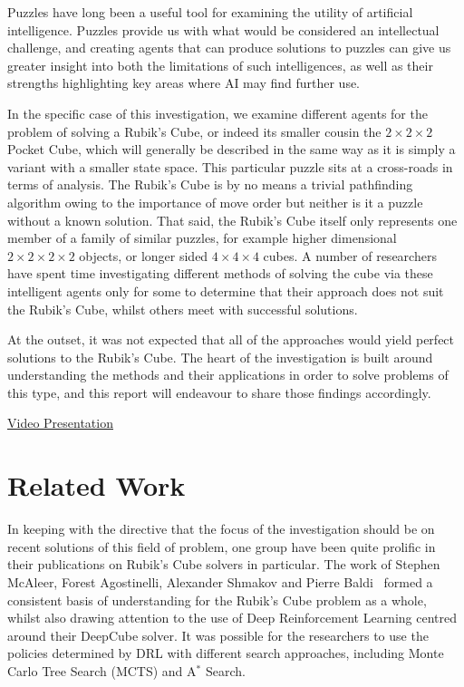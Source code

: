 \documentclass[UKenglish]{svproc}
\begin{document}
Puzzles have long been a useful tool for examining the utility of artificial intelligence. Puzzles provide us with what would be considered an intellectual challenge, and creating agents that can produce solutions to puzzles can give us greater insight into both the limitations of such intelligences, as well as their strengths highlighting key areas where AI may find further use.

In the specific case of this investigation, we examine different agents for the problem of solving a Rubik's Cube, or indeed its smaller cousin the $2\times 2\times 2$ Pocket Cube, which will generally be described in the same way as it is simply a variant with a smaller state space. This particular puzzle sits at a cross-roads in terms of analysis. The Rubik's Cube is by no means a trivial pathfinding algorithm owing to the importance of move order but neither is it a puzzle without a known solution. That said, the Rubik's Cube itself only represents one member of a family of similar puzzles, for example higher dimensional $2\times 2\times 2\times 2$ objects, or longer sided $4\times 4\times 4$ cubes. A number of researchers have spent time investigating different methods of solving the cube via these intelligent agents only for some to determine that their approach does not suit the Rubik's Cube, whilst others meet with successful solutions.

At the outset, it was not expected that all of the approaches would yield perfect solutions to the Rubik's Cube. The heart of the investigation is built around understanding the methods and their applications in order to solve problems of this type, and this report will endeavour to share those findings accordingly.

\par

\centerline{
\href{https://tcdud-my.sharepoint.com/:v:/g/personal/wosulliv_tcd_ie/EfZp76zjybdOkXOPufEgXxcB1N7eRqVvDfTOixktLc8bgA?e=lQsjbX}{Video Presentation}}

\section{Related Work}
In keeping with the directive that the focus of the investigation should be on recent solutions of this field of problem, one group have been quite prolific in their publications on Rubik's Cube solvers in particular. The work of Stephen McAleer, Forest Agostinelli, Alexander Shmakov and Pierre Baldi~\cite{mcaleer2018solving, mcaleer2019solving, agostinelli2019solving} formed a consistent basis of understanding for the Rubik's Cube problem as a whole, whilst also drawing attention to the use of Deep Reinforcement Learning centred around their DeepCube solver. It was possible for the researchers to use the policies determined by DRL with different search approaches, including Monte Carlo Tree Search (MCTS) and A$^{\ast}$ Search.
\end{document}
